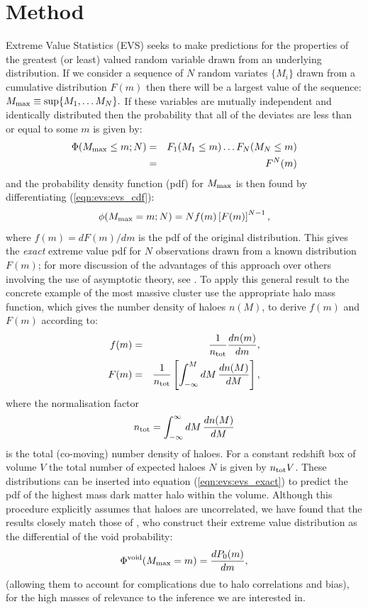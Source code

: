 \documentclass[twocolumn,useAMS,usenatbib,usegraphicx]{mn2e}
\begin{document}
\section{Method}
\label{sec:methods}
Extreme Value Statistics (EVS) \citep{Gumbel, KatzEVD} seeks to make
predictions for the properties of the greatest (or least) valued
random variable drawn from an underlying distribution. If we
consider a sequence of $N$ random variates $\lbrace M_i \rbrace$
drawn from a cumulative distribution $F(m)$ then there will be a
largest value of the sequence: $M_{\rm max} \equiv \sup \lbrace M_1, \ldots
M_N \rbrace.$
If these variables are mutually independent and identically
distributed then the probability that all of the deviates are less
than or equal to some $m$ is given by:
\begin{eqnarray}
\label{eqn:evs:evs_cdf} \Phi(M_{\rm max} \leq m;N) & = & F_1(M_1
\leq m)\ldots F_N(M_N \leq m)\nonumber\\
 & = & F^{N}(m)
\end{eqnarray}
and the probability density function (pdf) for $M_{\rm max}$ is then
found by differentiating (\ref{eqn:evs:evs_cdf}):
\begin{equation}
\label{eqn:evs:evs_exact} \phi(M_{\rm max} = m;N) = N f(m) \left[
F(m) \right]^{N-1},
\end{equation}
where $f(m)=dF(m)/dm$ is the pdf of the original distribution. This
gives the \emph{exact} extreme value pdf for $N$ observations drawn
from a known distribution $F(m)$; for more discussion of the
advantages of this approach over others involving the use of
asymptotic theory, see \citep{Harrison2011}. To apply this general result to the concrete example of the most
massive cluster use the appropriate halo mass function, which gives
the number density of haloes $n(M)$, to derive $f(m)$ and $F(m)$
according to:
\begin{eqnarray}
\label{eqn:hmf_evs:evs_exact}
f(m) &=& \frac{1}{n_{\rm tot}}\frac{dn(m)}{dm}, \\
F(m) &=& \frac{1}{n_{\rm tot}}\left[ \int_{-\infty}^{M} dM \,
\frac{dn(M)}{dM} \right],
\end{eqnarray}
where the normalisation factor
\begin{eqnarray}
\label{eqn:evs_exact:norm} n_{\rm tot} = \int_{-\infty}^{\infty} dM
\, \frac{dn(M)}{dM}
\end{eqnarray}
is the total (co-moving) number density of haloes. For a constant
redshift box of volume $V$ the total number of expected haloes $N$
is given by $n_{\rm tot}V$. These distributions can be inserted into
equation (\ref{eqn:evs:evs_exact}) to predict the pdf of the highest
mass dark matter halo within the volume. Although this procedure
explicitly assumes that haloes are uncorrelated, we have found
\citep{Harrison2011} that the results closely match those of
\cite{Davis2011}, who construct their extreme value distribution as
the differential of the void probability:
\begin{eqnarray}
\label{eqn:hmf_evs:ddcsp_evt} \Phi^{\rm void}(M_{\rm max} = m) =
\frac{dP_{0}(m)}{dm},
\end{eqnarray}
(allowing them to account for complications due to halo correlations
and bias), for the high masses of relevance to the inference we are
interested in.
\end{document}
